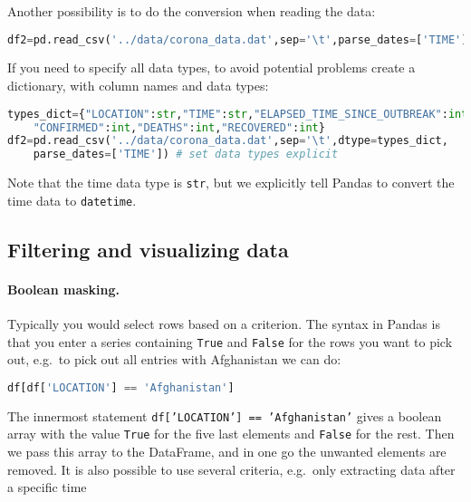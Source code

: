 \documentclass[graybox,sectrefs,envcountresetchap,open=right,final]{svmonodo}
\begin{document}
Another possibility is to do the conversion when reading the data:


\begin{lstlisting}[language=python,style=blue1bar]
df2=pd.read_csv('../data/corona_data.dat',sep='\t',parse_dates=['TIME']) 

\end{lstlisting}

If you need to specify all data types, to avoid potential problems create a dictionary, with column names and data types:





\begin{lstlisting}[language=python,style=blue1bar]
types_dict={"LOCATION":str,"TIME":str,"ELAPSED_TIME_SINCE_OUTBREAK":int,
	"CONFIRMED":int,"DEATHS":int,"RECOVERED":int}
df2=pd.read_csv('../data/corona_data.dat',sep='\t',dtype=types_dict,
	parse_dates=['TIME']) # set data types explicit

\end{lstlisting}

Note that the time data type is \texttt{str}, but we explicitly tell Pandas to convert the time data to \texttt{datetime}.

\subsection{Filtering and visualizing data}
\paragraph{Boolean masking.}
Typically you would select rows based on a criterion. The syntax in Pandas is that you enter a series containing \texttt{True} and \texttt{False} for the rows you want to pick out, e.g.~to pick out all entries with Afghanistan we can do:


\begin{lstlisting}[language=python,style=blue1bar]
df[df['LOCATION'] == 'Afghanistan']

\end{lstlisting}

The innermost statement \texttt{df['LOCATION'] == 'Afghanistan'} gives a boolean array with the value \texttt{True} for the five last elements and \texttt{False} for the rest. Then we pass this array to the DataFrame, and in one go the unwanted elements are removed. It is also possible to use several criteria, e.g.~only extracting data after a specific time
\end{document}
